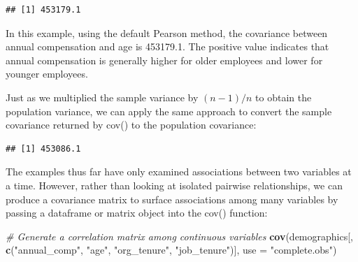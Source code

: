 \documentclass[]{book}
\newenvironment{Shaded}{\begin{snugshade}}{\end{snugshade}}
\newcommand{\CommentTok}[1]{\textcolor[rgb]{0.56,0.35,0.01}{\textit{#1}}}
\newcommand{\DataTypeTok}[1]{\textcolor[rgb]{0.13,0.29,0.53}{#1}}
\newcommand{\DecValTok}[1]{\textcolor[rgb]{0.00,0.00,0.81}{#1}}
\newcommand{\KeywordTok}[1]{\textcolor[rgb]{0.13,0.29,0.53}{\textbf{#1}}}
\newcommand{\NormalTok}[1]{#1}
\newcommand{\OperatorTok}[1]{\textcolor[rgb]{0.81,0.36,0.00}{\textbf{#1}}}
\newcommand{\StringTok}[1]{\textcolor[rgb]{0.31,0.60,0.02}{#1}}
\begin{document}
\begin{Shaded}
\end{Shaded}

\begin{verbatim}
## [1] 453179.1
\end{verbatim}

In this example, using the default Pearson method, the covariance between annual compensation and age is 453179.1. The positive value indicates that annual compensation is generally higher for older employees and lower for younger employees.

Just as we multiplied the sample variance by \((n - 1) / n\) to obtain the population variance, we can apply the same approach to convert the sample covariance returned by cov() to the population covariance:

\begin{Shaded}
\end{Shaded}

\begin{verbatim}
## [1] 453086.1
\end{verbatim}

The examples thus far have only examined associations between two variables at a time. However, rather than looking at isolated pairwise relationships, we can produce a covariance matrix to surface associations among many variables by passing a dataframe or matrix object into the cov() function:

\begin{Shaded}
\begin{Highlighting}[]
\CommentTok{# Generate a correlation matrix among continuous variables}
\KeywordTok{cov}\NormalTok{(demographics[, }\KeywordTok{c}\NormalTok{(}\StringTok{"annual_comp"}\NormalTok{, }\StringTok{"age"}\NormalTok{, }\StringTok{"org_tenure"}\NormalTok{, }\StringTok{"job_tenure"}\NormalTok{)], }\DataTypeTok{use =} \StringTok{"complete.obs"}\NormalTok{)}
\end{Highlighting}
\end{Shaded}
\end{document}
